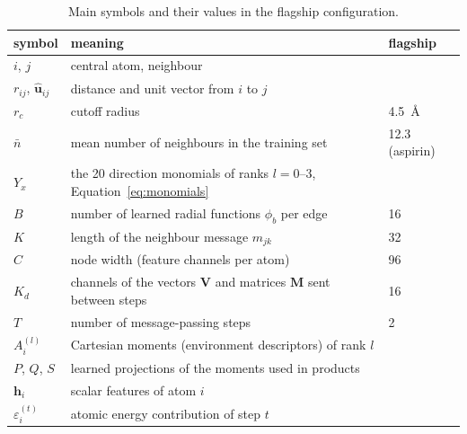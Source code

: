 \documentclass[journal=jctcce,manuscript=article,layout=traditional]{achemso}
\newcommand{\vect}[1]{\bm{#1}}
\begin{document}
\begin{table}
\caption{Main symbols and their values in the flagship configuration.}
\label{tab:notation}
\small
\begin{tabular}{lll}
\toprule
symbol & meaning & flagship \\
\midrule
$i$, $j$ & central atom, neighbour & \\
$r_{ij}$, $\hat{\vect u}_{ij}$ & distance and unit vector from $i$ to $j$ & \\
$r_c$ & cutoff radius & 4.5~\AA \\
$\bar n$ & mean number of neighbours in the training set & 12.3 (aspirin) \\
$Y_x$ & the 20 direction monomials of ranks $l=0$--3, Equation~\ref{eq:monomials} & \\
$B$ & number of learned radial functions $\phi_b$ per edge & 16 \\
$K$ & length of the neighbour message $m_{jk}$ & 32 \\
$C$ & node width (feature channels per atom) & 96 \\
$K_d$ & channels of the vectors $\vect V$ and matrices $\vect M$ sent between steps & 16 \\
$T$ & number of message-passing steps & 2 \\
$A^{(l)}_i$ & Cartesian moments (environment descriptors) of rank $l$ & \\
$P$, $Q$, $S$ & learned projections of the moments used in products & \\
$\vect h_i$ & scalar features of atom $i$ & \\
$\varepsilon_i^{(t)}$ & atomic energy contribution of step $t$ & \\
\bottomrule
\end{tabular}
\end{table}
\end{document}
